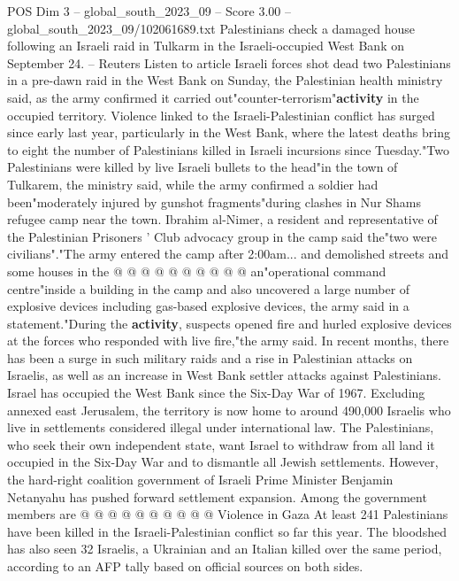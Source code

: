 \begin{textsample}{POS Dim 3 – global\_south\_2023\_09 – Score 3.00 – global\_south\_2023\_09/102061689.txt}  \label{ex:f3_pos_125}
Palestinians check a damaged house following an Israeli raid in Tulkarm in the Israeli-occupied West Bank on September 24. -- Reuters Listen to article Israeli forces shot dead two Palestinians in a pre-dawn raid in the West Bank on Sunday, the Palestinian health ministry said, as the army confirmed it carried out"counter-terrorism"\textbf{activity} in the occupied territory.
Violence linked to the Israeli-Palestinian conflict has surged since early last year, particularly in the West Bank, where the latest deaths bring to eight the number of Palestinians killed in Israeli incursions since Tuesday."Two Palestinians were killed by live Israeli bullets to the head"in the town of Tulkarem, the ministry said, while the army confirmed a soldier had been"moderately injured by gunshot fragments"during clashes in Nur Shams refugee camp near the town.
Ibrahim al-Nimer, a resident and representative of the Palestinian Prisoners ' Club advocacy group in the camp said the"two were civilians"."The army entered the camp after 2:00am... and demolished streets and some houses in the @ @ @ @ @ @ @ @ @ @ an"operational command centre"inside a building in the camp and also uncovered a large number of explosive devices including gas-based explosive devices, the army said in a statement."During the \textbf{activity}, suspects opened fire and hurled explosive devices at the forces who responded with live fire,"the army said.
In recent months, there has been a surge in such military raids and a rise in Palestinian attacks on Israelis, as well as an increase in West Bank settler attacks against Palestinians.
Israel has occupied the West Bank since the Six-Day War of 1967.
Excluding annexed east Jerusalem, the territory is now home to around 490,000 Israelis who live in settlements considered illegal under international law.
The Palestinians, who seek their own independent state, want Israel to withdraw from all land it occupied in the Six-Day War and to dismantle all Jewish settlements.
However, the hard-right coalition government of Israeli Prime Minister Benjamin Netanyahu has pushed forward settlement expansion.
Among the government members are @ @ @ @ @ @ @ @ @ @ Violence in Gaza At least 241 Palestinians have been killed in the Israeli-Palestinian conflict so far this year.
The bloodshed has also seen 32 Israelis, a Ukrainian and an Italian killed over the same period, according to an AFP tally based on official sources on both sides.

\end{textsample}
